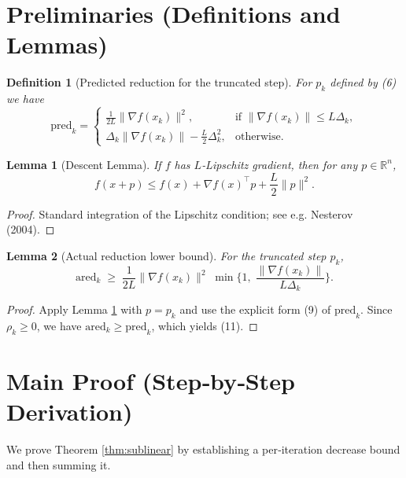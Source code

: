 \documentclass{article}
\newtheorem{lemma}{Lemma}
\newtheorem{definition}{Definition}
\begin{document}
\section*{Preliminaries (Definitions and Lemmas)}
\begin{definition}[Predicted reduction for the truncated step]\label{def:pred}
For $p_k$ defined by (6) we have
\[
\text{pred}_k=
\begin{cases}
\displaystyle \frac{1}{2L}\|\nabla f(x_k)\|^{2}, & \text{if }\|\nabla f(x_k)\|\le L\Delta_k,\\[6pt]
\displaystyle \Delta_k\|\nabla f(x_k)\|-\frac{L}{2}\Delta_k^{2}, & \text{otherwise}.
\end{cases}
\tag{9}
\]
\end{definition}
\begin{lemma}[Descent Lemma]\label{lem:descent}
If $f$ has $L$‑Lipschitz gradient, then for any $p\in\mathbb{R}^n$,
\[
f(x+p)\le f(x)+\nabla f(x)^{\top}p+\frac{L}{2}\|p\|^{2}.
\tag{10}
\]
\end{lemma}
\begin{proof}
Standard integration of the Lipschitz condition; see e.g. Nesterov (2004). \qedhere
\end{proof}
\begin{lemma}[Actual reduction lower bound]\label{lem:ared}
For the truncated step $p_k$,
\[
\text{ared}_k\;\ge\;\frac{1}{2L}\|\nabla f(x_k)\|^{2}\;\min\!\Big\{1,\;\frac{\|\nabla f(x_k)\|}{L\Delta_k}\Big\}.
\tag{11}
\]
\end{lemma}
\begin{proof}
Apply Lemma \ref{lem:descent} with $p=p_k$ and use the explicit form (9) of $\text{pred}_k$.  Since $\rho_k\ge0$, we have $\text{ared}_k\ge\text{pred}_k$, which yields (11). \qedhere
\end{proof}

\section*{Main Proof (Step‑by‑Step Derivation)}
We prove Theorem \ref{thm:sublinear} by establishing a per‑iteration decrease bound and then summing it.
\end{document}
